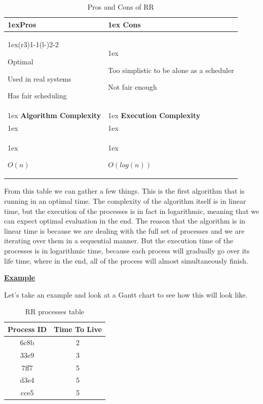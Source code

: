 \documentclass{article}
\begin{document}
\begin{table}[H]
  \begin{tabularx}{\linewidth}{>{\parskip1ex}X@{\kern4\tabcolsep}>{\parskip1ex}X}
    \toprule
    \hfil\bfseries Pros & \hfil\bfseries Cons \\
    \cmidrule(r{3\tabcolsep}){1-1}\cmidrule(l{-\tabcolsep}){2-2}

    Optimal\par
    Used in real systems\par
    Has fair scheduling\par

    &

    Too simplistic to be alone as a scheduler\par
    Not fair enough \\
    \bottomrule
    \toprule
    \hfil\bfseries Algorithm Complexity & \hfil\bfseries Execution Complexity \\

    \\
    \centerline{$O(n)$}\par

    &

    \centerline{$O(log(n))$}
  \end{tabularx}
  \caption{Pros and Cons of RR}
\end{table}

From this table we can gather a few things. This is the first algorithm that is running in an optimal time. The complexity of the algorithm itself is in linear time, but the execution of the processes is in fact in logarithmic, meaning that we can expect optimal evaluation in the end. The reason that the algorithm is in linear time is because we are dealing with the full set of processes and we are iterating over them in a sequential manner. But the execution time of the processes is in logarithmic time, because each process will gradually go over its life time, where in the end, all of the process will almost simultaneously finish.

\bigskip

\underline{\textbf{Example}}

Let's take an example and look at a Gantt chart to see how this will look like.

\begin{table}[H]
  \begin{center}
    \label{tab:RR processes}
    \begin{tabular}{c|c}
      \toprule
      \textbf{Process ID} & \textbf{Time To Live} \\
      \midrule
      6c8b & 2 \\
      33e9 & 3 \\
      7ff7 & 5 \\
      d3e4 & 5 \\
      cce5 & 5 \\
      \bottomrule
    \end{tabular}
    \caption{RR processes table}
  \end{center}
\end{table}
\end{document}
